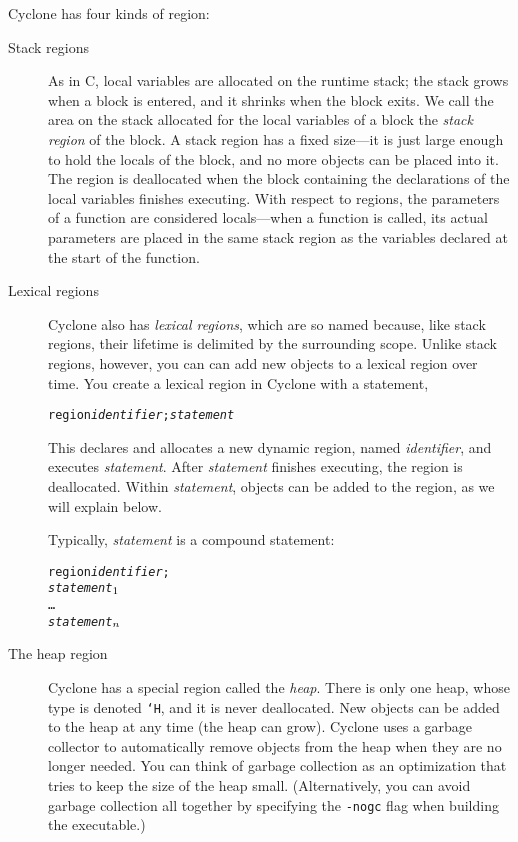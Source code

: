 Cyclone has four kinds of region:
\begin{description}
\item[Stack regions] As in C, local variables are allocated on the
  runtime stack; the stack grows when a block is entered, and it
  shrinks when the block exits.  We call the area on the stack
  allocated for the local variables of a block the \emph{stack region}
  of the block.  A stack region has a fixed size---it is just large
  enough to hold the locals of the block, and no more objects can be
  placed into it.  The region is deallocated when the block containing
  the declarations of the local variables finishes executing.  With
  respect to regions, the parameters of a function are considered
  locals---when a function is called, its actual parameters are placed
  in the same stack region as the variables declared at the start of
  the function.
  
\item[Lexical regions] Cyclone also has \emph{lexical regions}, which are so
  named because, like stack regions, their lifetime is delimited by the
  surrounding scope.  Unlike stack regions, however, you can can add new
  objects to a lexical region over time.  You create a lexical region in
  Cyclone with a statement,
\begin{alltt}
  region {\it identifier}; {\it statement}
\end{alltt}
  This declares and allocates a new dynamic region, named
  \textit{identifier}, and executes \textit{statement}.  After
  \textit{statement} finishes executing, the region is deallocated.
  Within \textit{statement}, objects can be added to the region, as we
  will explain below.

  Typically, \textit{statement} is a compound statement:
\begin{alltt}
  \lb region \textit{identifier};
    {\it statement}\(\sb{1}\)
    \ldots
    {\it statement}\(\sb{n}\)
  \rb
\end{alltt}

\item[The heap region] Cyclone has a special region called the
  \emph{heap}. There is only one heap, whose type is denoted \texttt{`H},
  and it is never deallocated.  New objects can be added to the heap at any
  time (the heap can grow).  Cyclone uses a garbage collector to
  automatically remove objects from the heap when they are no longer needed.
  You can think of garbage collection as an optimization that tries to keep
  the size of the heap small.  (Alternatively, you can avoid garbage
  collection all together by specifying the \texttt{-nogc} flag when
  building the executable.)


\end{description}

